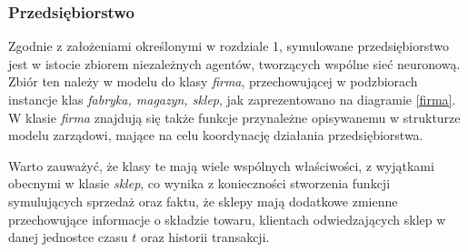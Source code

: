\documentclass[polish, twoside, 12pt, a4paper]{article}
\theoremstyle{definition}
\theoremstyle{plain}
\theoremstyle{remark}
\begin{document}
\subsubsection{Przedsiębiorstwo}

Zgodnie z założeniami określonymi w rozdziale 1, symulowane przedsiębiorstwo jest w istocie zbiorem niezależnych agentów, tworzących wspólne sieć neuronową. Zbiór ten należy w modelu do klasy \textit{firma}, przechowującej w podzbiorach instancje klas \textit{fabryka, magazyn, sklep}, jak zaprezentowano na diagramie \ref{firma}. W klasie \textit{firma} znajdują się także funkcje przynależne opisywanemu w strukturze modelu zarządowi, mające na celu koordynację działania przedsiębiorstwa. 

Warto zauważyć, że klasy te mają wiele wspólnych właściwości, z wyjątkami obecnymi w klasie \textit{sklep}, co wynika z konieczności stworzenia funkcji symulujących sprzedaż oraz faktu, że sklepy mają dodatkowe zmienne przechowujące informacje o składzie towaru, klientach odwiedzających sklep w danej jednostce czasu $t$ oraz historii transakcji.  

\end{document}
